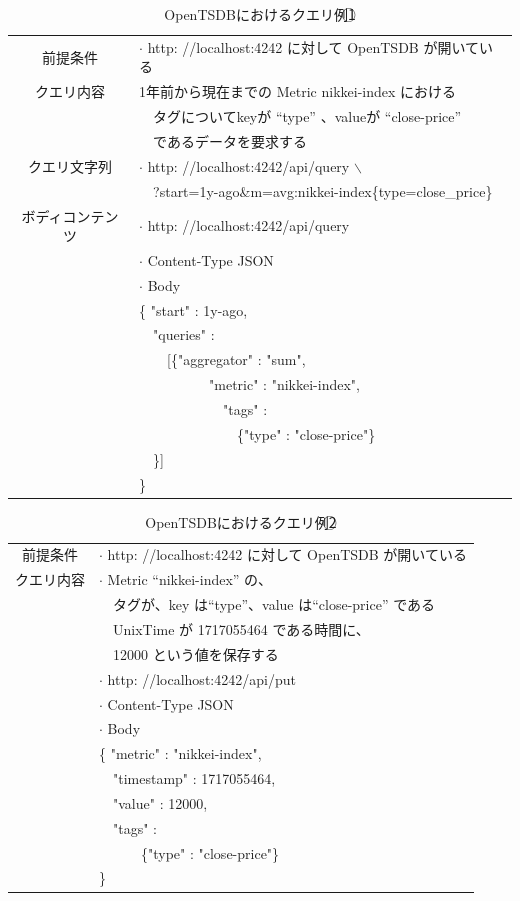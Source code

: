 \documentclass{scrartcl}
\begin{document}
\begin{table}[htbp]
\caption{OpenTSDBにおけるクエリ例\textcircled{\scriptsize 1}}
\centering
\begin{tabular}{|c|l|}
\hline
前提条件 & \(\cdot\) http: //localhost:4242 に対して OpenTSDB が開いている\\
クエリ内容 & 1年前から現在までの Metric nikkei-index における\\
 & 　タグについてkeyが ``type'' 、valueが ``close-price''\\
 & 　であるデータを要求する\\
\hline
クエリ文字列 & \(\cdot\) http: //localhost:4242/api/query $\backslash$\\
 & 　?start=1y-ago\&m=avg:nikkei-index\{type=close\_price\}\\
\hline
ボディコンテンツ & \(\cdot\) http: //localhost:4242/api/query\\
 & \(\cdot\) Content-Type JSON\\
 & \(\cdot\) Body\\
 & \{ "start" : 1y-ago,\\
 & 　"queries" :\\
 & 　　[\{"aggregator" : "sum",\\
 & 　　　　　"metric" : "nikkei-index",\\
 & 　　　　　　"tags" :\\
 & 　　　　　　　\{"type" : "close-price"\}\\
 & 　\}]\\
 & \}\\
\hline
\end{tabular}
\end{table}

\begin{table}[htbp]
\caption{OpenTSDBにおけるクエリ例\textcircled{\scriptsize 2}}
\centering
\begin{tabular}{|c|l|}
\hline
前提条件 & \(\cdot\) http: //localhost:4242 に対して OpenTSDB が開いている\\
クエリ内容 & \(\cdot\) Metric ``nikkei-index'' の、\\
 & 　タグが、key は``type''、value は``close-price'' である\\
 & 　UnixTime が 1717055464 である時間に、\\
 & 　12000 という値を保存する\\
\hline
 & \(\cdot\) http: //localhost:4242/api/put\\
 & \(\cdot\) Content-Type JSON\\
 & \(\cdot\) Body\\
 & \{ "metric" : "nikkei-index",\\
 & 　"timestamp" : 1717055464,\\
 & 　"value" : 12000,\\
 & 　"tags" :\\
 & 　　　\{"type" : "close-price"\}\\
 & \}\\
\hline
\end{tabular}
\end{table}
\end{document}
